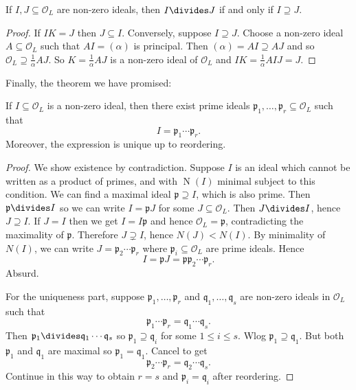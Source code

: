 \documentclass[a4paper]{article}
\renewcommand*{\O}{\mathcal{O}}
\DeclareMathOperator{\n}{N}
\begin{document}
\begin{corollary}
  If \(I, J \subseteq \O_L\) are non-zero ideals, then \(I \divides J\) if and only if \(I \supseteq J\).
\end{corollary}

\begin{proof}
  If \(IK = J\) then \(J \subseteq I\). Conversely, suppose \(I \supseteq J\). Choose a non-zero ideal \(A \subseteq \O_L\) such that \(AI = (\alpha)\) is principal. Then \((\alpha) = AI \supseteq AJ\) and so \(\O_L \supseteq \frac{1}{\alpha}AJ\). So \(K = \frac{1}{\alpha}AJ\) is a non-zero ideal of \(\O_L\) and \(IK = \frac{1}{\alpha}AIJ = J\).
\end{proof}

Finally, the theorem we have promised:

\begin{theorem}
  If \(I \subseteq \O_L\) is a non-zero ideal, then there exist prime ideals \(\mathfrak{p}_1, \dots, \mathfrak{p}_r \subseteq \O_L\) such that
  \[
    I = \mathfrak{p}_1\cdots \mathfrak{p}_r.
  \]
  Moreover, the expression is unique up to reordering.
\end{theorem}

\begin{proof}
  We show existence by contradiction. Suppose \(I\) is an ideal which cannot be written as a product of primes, and with \(\n(I)\) minimal subject to this condition. We can find a maximal ideal \(\mathfrak{p} \supseteq I\), which is also prime. Then \(\mathfrak{p} \divides I\) so we can write \(I = \mathfrak{p}J\) for some \(J \subseteq \O_L\). Then \(J \divides I\), hence \(J \supseteq I\). If \(J = I\) then we get \(I = I\mathfrak{p}\) and hence \(\O_L = \mathfrak{p}\), contradicting the maximality of \(\mathfrak{p}\). Therefore \(J \supsetneq I\), hence \(N(J) < N(I)\). By minimality of \(N(I)\), we can write \(J = \mathfrak{p}_2 \cdots \mathfrak{p}_r\) where \(\mathfrak{p}_i \subseteq \O_L\) are prime ideals. Hence
  \[
    I = \mathfrak{p}J = \mathfrak{p}\mathfrak{p}_2 \cdots \mathfrak{p}_r.
  \]
  Absurd.

  For the uniqueness part, suppose \(\mathfrak{p}_1, \dots, \mathfrak{p}_r\) and \(\mathfrak{q}_1, \dots, \mathfrak{q}_s\) are non-zero ideals in \(\O_L\) such that
  \[
    \mathfrak{p}_1 \cdots \mathfrak{p}_r = \mathfrak{q}_1 \cdots \mathfrak{q}_s.
  \]
  Then \(\mathfrak{p}_1 \divides \mathfrak{q}_1 \cdots \mathfrak{q}_s\) so \(\mathfrak{p}_1 \supseteq \mathfrak{q}_i\) for some \(1 \leq i \leq s\). Wlog \(\mathfrak{p}_1 \supseteq \mathfrak{q}_1\). But both \(\mathfrak{p}_1\) and \(\mathfrak{q}_1\) are maximal so \(\mathfrak{p}_1 = \mathfrak{q}_1\). Cancel to get
  \[
    \mathfrak{p}_2\cdots \mathfrak{p}_r = \mathfrak{q}_2 \cdots \mathfrak{q}_s.
  \]
  Continue in this way to obtain \(r = s\) and \(\mathfrak{p}_i = \mathfrak{q}_i\) after reordering.
\end{proof}
\end{document}
